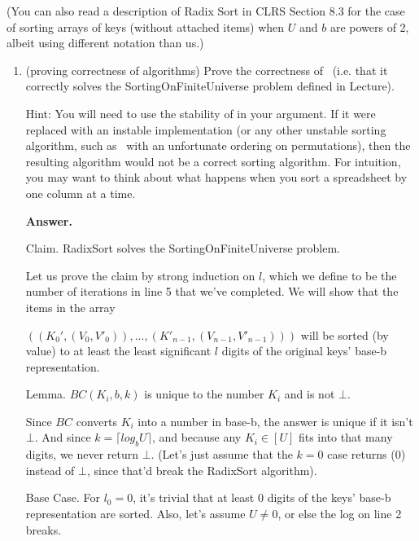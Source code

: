 \documentclass[11pt]{article}
\begin{document}
\begin{enumerate}
(You can also read a description of Radix Sort in CLRS Section 8.3 for the case of sorting arrays of keys (without attached items) when $U$ and $b$ are powers of 2, albeit using different notation than us.)

        \begin{enumerate}

            \item (proving correctness of algorithms) Prove the correctness of \RadixSort\ (i.e. that it correctly solves the SortingOnFiniteUniverse problem defined in Lecture).

            Hint: You will need to use the stability of \SingletonBucketSort in your argument. If it were replaced with an instable implementation (or any other unstable sorting algorithm, such as \ExhaustiveSearchSort\ with an unfortunate ordering on permutations), then the resulting algorithm would not be a correct sorting algorithm.   For intuition, you may want to think about what happens when you sort a spreadsheet by one column at a time.
            
            \smallskip
            \noindent\textbf{Answer.}
            
            Claim. RadixSort solves the SortingOnFiniteUniverse problem.
            
            Let us prove the claim by strong induction on $l$, which we define to be the number of  iterations in line 5 that we've completed. We will show that the items in the array 
            
            $((K_0', (V_0, V'_0)), ..., (K'_{n-1}, (V_{n-1}, V'_{n-1})))$ will be sorted (by value) to at least the least significant $l$ digits of the original keys' base-b representation.
            
            \bigskip
            
            Lemma. $BC(K_i, b, k)$ is unique to the number $K_i$ and is not $\bot$.
            
            Since $BC$ converts $K_i$ into a number in base-b, the answer is unique if it isn't $\bot$. And since $k=\lceil log_bU\rceil$, and because any $K_i\in[U]$ fits into that many digits, we never return $\bot$. (Let's just assume that the $k=0$ case returns (0) instead of $\bot$, since that'd break the RadixSort algorithm).
            
            \bigskip
            
            Base Case. For $l_0=0$, it's trivial that at least 0 digits of the keys' base-b representation are sorted. Also, let's assume $U\neq 0$, or else the log on line 2 breaks.
            

\end{enumerate}
\end{enumerate}
\end{document}
